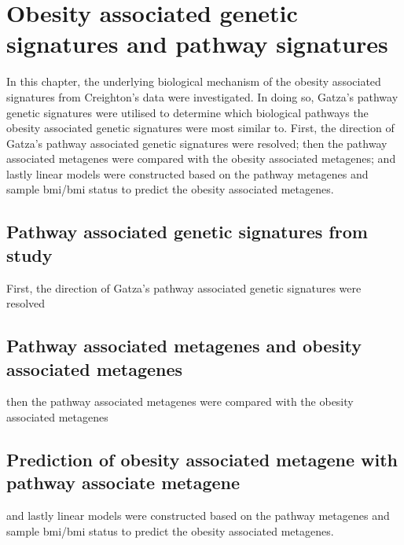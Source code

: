 \chapter{Obesity associated genetic signatures and pathway signatures}
\label{cha:obesity_associated_genetic_signature_and_pathway_signatures}

In this chapter, the underlying biological mechanism of the obesity associated signatures from Creighton's data were investigated.
In doing so, Gatza's pathway genetic signatures were utilised to determine which biological pathways the obesity associated genetic signatures were most similar to.
First, the direction of Gatza's pathway associated genetic signatures were resolved; then the pathway associated metagenes were compared with the obesity associated metagenes; and lastly linear models were constructed based on the pathway metagenes and sample \gls{bmi}/\gls{bmi} status to predict the obesity associated metagenes.

\section{Pathway associated genetic signatures from \citet{Gatza2010a} study}
\label{sec:pathway_associated_genetic_signatures_from_gatza2010a_study}

First, the direction of Gatza's pathway associated genetic signatures were resolved






\section{Pathway associated metagenes and obesity associated metagenes}
\label{sec:pathway_associated_metagenes_and_obesity_associated_metagenes}


then the pathway associated metagenes were compared with the obesity associated metagenes







\section{Prediction of obesity associated metagene with pathway associate metagene}
\label{sec:prediction_of_obesity_associated_metagene_with_pathway_associate_metagene}

and lastly linear models were constructed based on the pathway metagenes and sample \gls{bmi}/\gls{bmi} status to predict the obesity associated metagenes.





